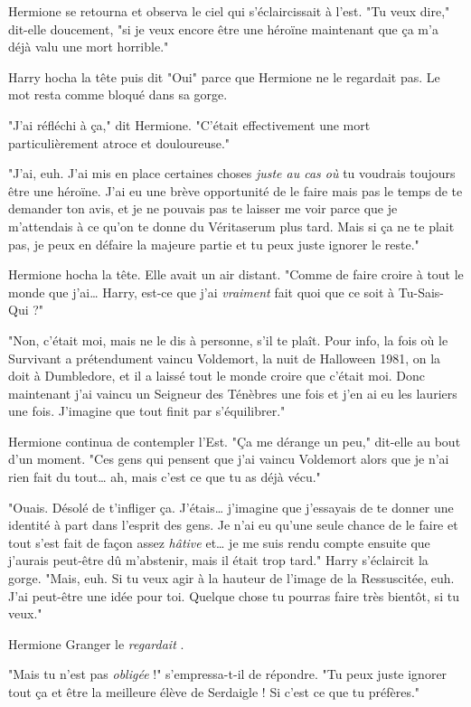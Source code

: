Hermione se retourna et observa le ciel qui s'éclaircissait à l'est. "Tu veux dire," dit-elle doucement, "si je veux encore être une héroïne maintenant que ça m'a déjà valu une mort horrible."

Harry hocha la tête puis dit "Oui" parce que Hermione ne le regardait pas. Le mot resta comme bloqué dans sa gorge.

"J'ai réfléchi à ça," dit Hermione. "C'était effectivement une mort particulièrement atroce et douloureuse."

"J'ai, euh. J'ai mis en place certaines choses \emph{juste au cas où}  tu voudrais toujours être une héroïne. J'ai eu une brève opportunité de le faire mais pas le temps de te demander ton avis, et je ne pouvais pas te laisser me voir parce que je m'attendais à ce qu'on te donne du Véritaserum plus tard. Mais si ça ne te plait pas, je peux en défaire la majeure partie et tu peux juste ignorer le reste."

Hermione hocha la tête. Elle avait un air distant. "Comme de faire croire à tout le monde que j'ai… Harry, est-ce que j'ai \emph{vraiment}  fait quoi que ce soit à Tu-Sais-Qui ?"

"Non, c'était moi, mais ne le dis à personne, s'il te plaît. Pour info, la fois où le Survivant a prétendument vaincu Voldemort, la nuit de Halloween 1981, on la doit à Dumbledore, et il a laissé tout le monde croire que c'était moi. Donc maintenant j'ai vaincu un Seigneur des Ténèbres une fois et j'en ai eu les lauriers une fois. J'imagine que tout finit par s'équilibrer."

Hermione continua de contempler l'Est. "Ça me dérange un peu," dit-elle au bout d'un moment. "Ces gens qui pensent que j'ai vaincu Voldemort alors que je n'ai rien fait du tout… ah, mais c'est ce que tu as déjà vécu."

"Ouais. Désolé de t'infliger ça. J'étais… j'imagine que j'essayais de te donner une identité à part dans l'esprit des gens. Je n'ai eu qu'une seule chance de le faire et tout s'est fait de façon assez \emph{hâtive}  et… je me suis rendu compte ensuite que j'aurais peut-être dû m'abstenir, mais il était trop tard." Harry s'éclaircit la gorge. "Mais, euh. Si tu veux agir à la hauteur de l'image de la Ressuscitée, euh. J'ai peut-être une idée pour toi. Quelque chose tu pourras faire très bientôt, si tu veux."

Hermione Granger le \emph{regardait} .

"Mais tu n'est pas \emph{obligée}  !" s'empressa-t-il de répondre. "Tu peux juste ignorer tout ça et être la meilleure élève de Serdaigle ! Si c'est ce que tu préfères."

